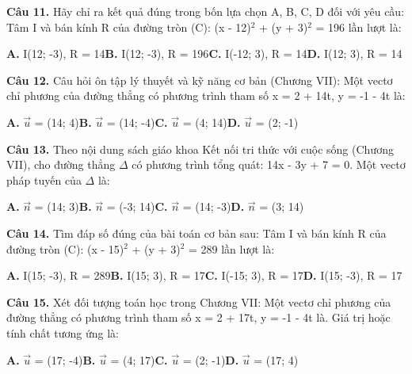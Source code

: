 \documentclass[11pt,a4paper]{article}
\begin{document}
\textbf{\color{primary} Câu 11.} Hãy chỉ ra kết quả đúng trong bốn lựa chọn A, B, C, D đối với yêu cầu: Tâm I và bán kính R của đường tròn (C): (x - 12)$^2$ + (y + 3)$^2$ = 196 lần lượt là:\par
\hspace*{1.5em}\textbf{A.} I(12; -3), R = 14\quad\quad \textbf{B.} I(12; -3), R = 196\quad\quad \textbf{C.} I(-12; 3), R = 14\quad\quad \textbf{D.} I(12; 3), R = 14\par\vspace{2pt}
\textbf{\color{primary} Câu 12.} Câu hỏi ôn tập lý thuyết và kỹ năng cơ bản (Chương VII): Một vectơ chỉ phương của đường thẳng có phương trình tham số x = 2 + 14t, y = -1 - 4t là:\par
\hspace*{1.5em}\textbf{A.} $\vec{u}$ = (14; 4)\quad\quad \textbf{B.} $\vec{u}$ = (14; -4)\quad\quad \textbf{C.} $\vec{u}$ = (4; 14)\quad\quad \textbf{D.} $\vec{u}$ = (2; -1)\par\vspace{2pt}
\textbf{\color{primary} Câu 13.} Theo nội dung sách giáo khoa Kết nối tri thức với cuộc sống (Chương VII), cho đường thẳng $\Delta$ có phương trình tổng quát: 14x - 3y + 7 = 0. Một vectơ pháp tuyến của $\Delta$ là:\par
\hspace*{1.5em}\textbf{A.} $\vec{n}$ = (14; 3)\quad\quad \textbf{B.} $\vec{n}$ = (-3; 14)\quad\quad \textbf{C.} $\vec{n}$ = (14; -3)\quad\quad \textbf{D.} $\vec{n}$ = (3; 14)\par\vspace{2pt}
\textbf{\color{primary} Câu 14.} Tìm đáp số đúng của bài toán cơ bản sau: Tâm I và bán kính R của đường tròn (C): (x - 15)$^2$ + (y + 3)$^2$ = 289 lần lượt là:\par
\hspace*{1.5em}\textbf{A.} I(15; -3), R = 289\quad\quad \textbf{B.} I(15; 3), R = 17\quad\quad \textbf{C.} I(-15; 3), R = 17\quad\quad \textbf{D.} I(15; -3), R = 17\par\vspace{2pt}
\textbf{\color{primary} Câu 15.} Xét đối tượng toán học trong Chương VII: Một vectơ chỉ phương của đường thẳng có phương trình tham số x = 2 + 17t, y = -1 - 4t là. Giá trị hoặc tính chất tương ứng là:\par
\hspace*{1.5em}\textbf{A.} $\vec{u}$ = (17; -4)\quad\quad \textbf{B.} $\vec{u}$ = (4; 17)\quad\quad \textbf{C.} $\vec{u}$ = (2; -1)\quad\quad \textbf{D.} $\vec{u}$ = (17; 4)\par\vspace{2pt}
\end{document}
